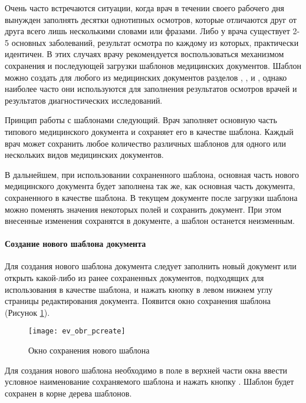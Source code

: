 {Очень часто встречаются ситуации, когда врач в течении своего рабочего дня вынужден заполнять десятки однотипных осмотров, которые отличаются друг от друга всего лишь несколькими словами или фразами. Либо у врача существует 2-5 основных заболеваний, результат осмотра по каждому из которых, практически идентичен. В этих случаях врачу рекомендуется воспользоваться механизмом сохранения и последующей загрузки шаблонов медицинских документов. Шаблон можно создать для любого из медицинских документов разделов , ,  и , однако наиболее часто они используются для заполнения результатов осмотров врачей и результатов диагностических исследований.

Принцип работы с шаблонами следующий. Врач заполняет основную часть типового медицинского документа и сохраняет его в качестве шаблона. Каждый врач может сохранить любое количество различных шаблонов для одного или нескольких видов медицинских документов.

В дальнейшем, при использовании сохраненного шаблона, основная часть нового медицинского документа будет заполнена так же, как основная часть документа, сохраненного в качестве шаблона. В текущем документе после загрузки шаблона можно поменять значения некоторых полей и сохранить документ. При этом внесенные изменения сохранятся в документе, а шаблон останется неизменным.


\paragraph{Создание нового шаблона документа} 

Для создания нового шаблона документа следует заполнить новый документ или открыть какой-либо из ранее сохраненных документов, подходящих для использования в качестве шаблона, и нажать кнопку  в левом нижнем углу страницы редактирования документа. Появится окно сохранения шаблона (Рисунок \ref{img_ev_obr_pcreate}).

 \begin{figure}[ht!]\centering
   \texttt{[image: ev\_obr\_pcreate]}
   \caption{Окно сохранения нового шаблона}
   \label{img_ev_obr_pcreate}
 \end{figure}

Для создания нового шаблона необходимо в поле  в верхней части окна ввести условное наименование сохраняемого шаблона и нажать кнопку . Шаблон будет сохранен в корне дерева шаблонов.

}
